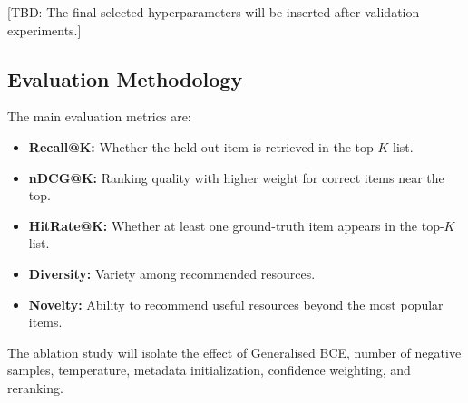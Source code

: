 [TBD: The final selected hyperparameters will be inserted after validation experiments.]

\subsection{Evaluation Methodology}

The main evaluation metrics are:

\begin{itemize}
    \item \textbf{Recall@K:} Whether the held-out item is retrieved in the top-$K$ list.
    \item \textbf{nDCG@K:} Ranking quality with higher weight for correct items near the top.
    \item \textbf{HitRate@K:} Whether at least one ground-truth item appears in the top-$K$ list.
    \item \textbf{Diversity:} Variety among recommended resources.
    \item \textbf{Novelty:} Ability to recommend useful resources beyond the most popular items.
\end{itemize}

The ablation study will isolate the effect of Generalised BCE, number of negative samples, temperature, metadata initialization, confidence weighting, and reranking.

\newpage
